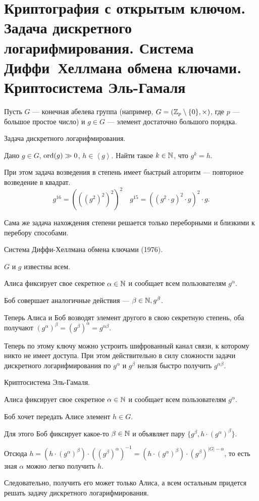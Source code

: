 \section{Криптография с открытым ключом. Задача дискретного логарифмирования. Система Диффи~Хеллмана обмена ключами. Криптосистема Эль-Гамаля}

Пусть $G$ --- конечная абелева группа (например, $G = (\mathbb{Z}_p \setminus \{0\}, \times)$, где $p$ --- большое простое число) и $g \in G$ --- элемент достаточно большого порядка.

\begin{problem}
    Задача дискретного логарифмирования.

    Дано $g \in G$, $\operatorname{\mathop{\mathrm{ord}}}(g) \gg 0$, $h \in \left< g \right>$. Найти такое $k \in \mathbb{N}$, что $g^{k} = h$.

    При этом задача возведения в степень имеет быстрый алгоритм --- повторное возведение в квадрат.
    \begin{equation*}
        g^{16} = \left(\left(\left(g^2\right)^2\right)^2\right)^2 \quad 
        g^{15} = \left(\left(g^2 \cdot g\right)^2 \cdot g\right)^2 \cdot g
    .\end{equation*}

    Сама же задача нахождения степени решается только переборными и близкими к перебору способами.
\end{problem}

\begin{problem}
    Система Диффи-Хеллмана обмена ключами (1976).

    $G$ и $g$ известны всем.

    Алиса фиксирует свое секретное $\alpha \in \mathbb{N}$ и сообщает всем пользователям $g^{\alpha}$.

    Боб совершает аналогичные действия --- $\beta \in \mathbb{N}, g^{\beta}$.

    Теперь Алиса и Боб возводят элемент другого в свою секретную степень, оба получают $(g^{\alpha})^{\beta} = \left(g^{\beta}\right)^{\alpha} = g^{\alpha\beta}$.

    Теперь по этому ключу можно устроить шифрованный канал связи, к которому никто не имеет доступа. При этом действительно в силу сложности задачи дискретного логарифмирования по $g^{\alpha}$ и $g^{\beta}$ нельзя быстро получить $g^{\alpha\beta}$.
\end{problem}

\begin{problem}
    Криптосистема Эль-Гамаля.

    Алиса фиксирует свое секретное $\alpha \in \mathbb{N}$ и сообщает всем пользователям $g^{\alpha}$.

    Боб хочет передать Алисе элемент $h \in G$.

    Для этого Боб фиксирует какое-то $\beta \in \mathbb{N}$ и объявляет пару $ \{g^{\beta}, h \cdot (g^{\alpha})^{\beta}\}$.

    Отсюда $h = \left(h \cdot (g^{\alpha})^{\beta}\right) \cdot ((g^{\beta})^{\alpha})^{-1} = (h \cdot (g^{\alpha})^{\beta}) \cdot (g^{\beta})^{|G|-\alpha}$, то есть зная $\alpha$ можно легко получить $h$.

    Следовательно, получить его может только Алиса, а всем остальным придется решать задачу дискретного логарифмирования.
\end{problem}
